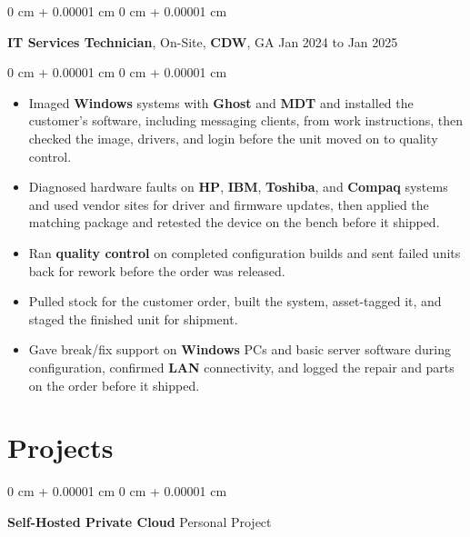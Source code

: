 \documentclass[10pt, letterpaper]{article}
\newenvironment{highlights}{
    \begin{itemize}[
        topsep=0.05 cm,
        parsep=0.03 cm,
        partopsep=0pt,
        itemsep=0.04 cm,
        leftmargin=0 cm + 10pt
    ]
}{
    \end{itemize}
} %
\newenvironment{onecolentry}{
    \begin{adjustwidth}{
        0 cm + 0.00001 cm
    }{
        0 cm + 0.00001 cm
    }
}{
    \end{adjustwidth}
} %
\newcommand{\resumeheading}[2]{%
    \begin{onecolentry}
        #1 \hfill #2
    \end{onecolentry}
} %
\begin{document}
\vspace{0.16 cm}
\resumeheading{\textbf{IT Services Technician}, On-Site, \textbf{CDW}, GA}{Jan 2024 to Jan 2025}

\begin{onecolentry}
\begin{highlights}
	\item Imaged \textbf{Windows} systems with \textbf{Ghost} and \textbf{MDT} and installed the customer's software, including messaging clients, from work instructions, then checked the image, drivers, and login before the unit moved on to quality control.
	\item Diagnosed hardware faults on \textbf{HP}, \textbf{IBM}, \textbf{Toshiba}, and \textbf{Compaq} systems and used vendor sites for driver and firmware updates, then applied the matching package and retested the device on the bench before it shipped.
	\item Ran \textbf{quality control} on completed configuration builds and sent failed units back for rework before the order was released.
	\item Pulled stock for the customer order, built the system, asset-tagged it, and staged the finished unit for shipment.
	\item Gave break/fix support on \textbf{Windows} PCs and basic server software during configuration, confirmed \textbf{LAN} connectivity, and logged the repair and parts on the order before it shipped.
\end{highlights}
\end{onecolentry}


\vspace{0.14 cm}

\section{Projects}

\resumeheading{\textbf{Self-Hosted Private Cloud}}{Personal Project}
\end{document}
